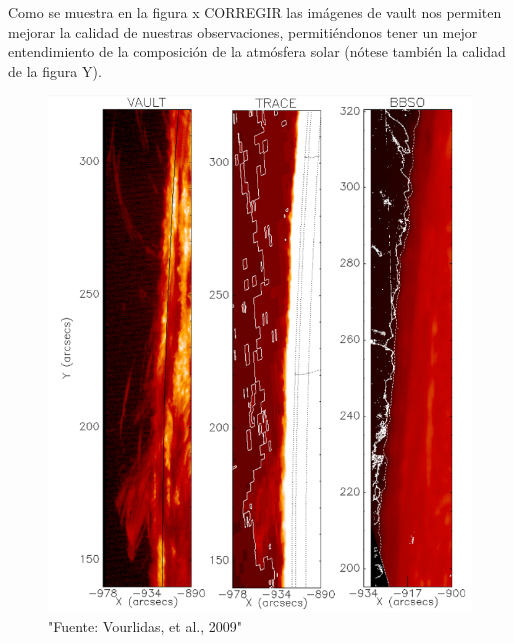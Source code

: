 \documentclass[9pt]{book}
\begin{document}
Como se muestra en la figura x CORREGIR las im\'agenes de vault nos permiten mejorar la calidad de nuestras observaciones, permiti\'endonos tener un mejor entendimiento de la composici\'on de la atm\'osfera solar (n\'otese tambi\'en la calidad de la figura Y).

\begin{figure}[h]
\centering
\includegraphics[scale=0.6]{vault_comparison}
\caption{"Fuente: Vourlidas, et al., 2009"}
\label{fig:vault_compare}
\end{figure}
\end{document}
